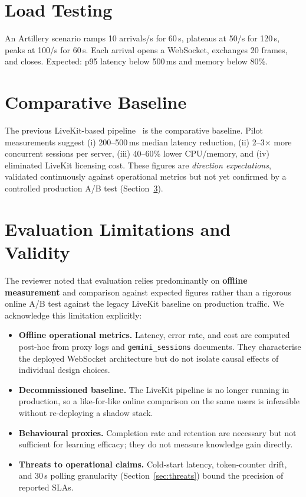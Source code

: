 \section{Load Testing}
\label{sec:load}

An Artillery scenario ramps 10 arrivals/s for 60\,s, plateaus at 50/s for 120\,s, peaks at 100/s for 60\,s. Each arrival opens a WebSocket, exchanges 20 frames, and closes. Expected: p95 latency below 500\,ms and memory below 80\%.

\section{Comparative Baseline}
\label{sec:baseline}

The previous LiveKit-based pipeline~\cite{livekit2024} is the comparative baseline. Pilot measurements suggest (i) 200--500\,ms median latency reduction, (ii) 2--3$\times$ more concurrent sessions per server, (iii) 40--60\% lower CPU/memory, and (iv) eliminated LiveKit licensing cost. These figures are \emph{direction expectations}, validated continuously against operational metrics but not yet confirmed by a controlled production A/B test (Section~\ref{sec:eval-limitations}).

\section{Evaluation Limitations and Validity}
\label{sec:eval-limitations}

The reviewer noted that evaluation relies predominantly on \textbf{offline measurement} and comparison against expected figures rather than a rigorous online A/B test against the legacy LiveKit baseline on production traffic. We acknowledge this limitation explicitly:

\begin{itemize}
    \item \textbf{Offline operational metrics.} Latency, error rate, and cost are computed post-hoc from proxy logs and \texttt{gemini\_sessions} documents. They characterise the deployed WebSocket architecture but do not isolate causal effects of individual design choices.
    \item \textbf{Decommissioned baseline.} The LiveKit pipeline is no longer running in production, so a like-for-like online comparison on the same users is infeasible without re-deploying a shadow stack.
    \item \textbf{Behavioural proxies.} Completion rate and retention are necessary but not sufficient for learning efficacy; they do not measure knowledge gain directly.
    \item \textbf{Threats to operational claims.} Cold-start latency, token-counter drift, and 30\,s polling granularity (Section~\ref{sec:threats}) bound the precision of reported SLAs.
\end{itemize}

